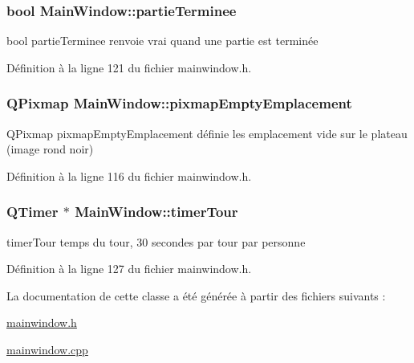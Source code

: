 \hypertarget{class_main_window_a00d26707b5d27cc6ce07479a46244692}{
\subsubsection[{partie\-Terminee}]{\setlength{\rightskip}{0pt plus 5cm}bool Main\-Window\-::partie\-Terminee}}\label{class_main_window_a00d26707b5d27cc6ce07479a46244692}


bool partie\-Terminee  renvoie vrai quand une partie est terminée 



Définition à la ligne 121 du fichier mainwindow.\-h.

\hypertarget{class_main_window_a40ca81795033b7d295527bc860f716cf}{
\subsubsection[{pixmap\-Empty\-Emplacement}]{\setlength{\rightskip}{0pt plus 5cm}Q\-Pixmap Main\-Window\-::pixmap\-Empty\-Emplacement}}\label{class_main_window_a40ca81795033b7d295527bc860f716cf}


Q\-Pixmap pixmap\-Empty\-Emplacement  définie les emplacement vide sur le plateau (image rond noir) 



Définition à la ligne 116 du fichier mainwindow.\-h.

\hypertarget{class_main_window_a6d86dd50bcd7dc534fbc9fd374260554}{
\subsubsection[{timer\-Tour}]{\setlength{\rightskip}{0pt plus 5cm}Q\-Timer $\ast$ Main\-Window\-::timer\-Tour}}\label{class_main_window_a6d86dd50bcd7dc534fbc9fd374260554}


timer\-Tour  temps du tour, 30 secondes par tour par personne 



Définition à la ligne 127 du fichier mainwindow.\-h.



La documentation de cette classe a été générée à partir des fichiers suivants \-:\begin{DoxyCompactItemize}
\item 
\hyperlink{mainwindow_8h}{mainwindow.\-h}\item 
\hyperlink{mainwindow_8cpp}{mainwindow.\-cpp}\end{DoxyCompactItemize}
